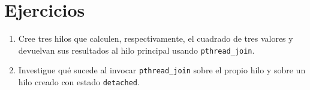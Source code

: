 \documentclass[12pt,a4paper]{article}
\begin{document}
\section{Ejercicios}
\begin{enumerate}
    \item Cree tres hilos que calculen, respectivamente, el cuadrado de tres valores y devuelvan sus resultados al hilo principal usando \texttt{pthread\_join}.
    \item Investigue qué sucede al invocar \texttt{pthread\_join} sobre el propio hilo y sobre un hilo creado con estado \texttt{detached}.
\end{enumerate}
\end{document}
